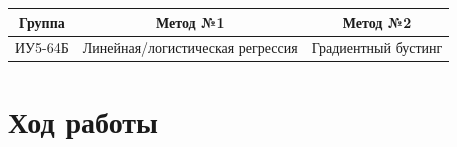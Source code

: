 \documentclass[a4paper]{article}
\begin{document}
  \begin{center}
    \begin{tabular}{|c|c|c|}
      \hline
      Группа & Метод №1 & Метод №2 \\
      \hline
      ИУ5-64Б & Линейная/логистическая регрессия & Градиентный бустинг \\
      \hline
    \end{tabular}
  \end{center}

  \section*{Ход работы}
  \clearpage
  
\end{document}
